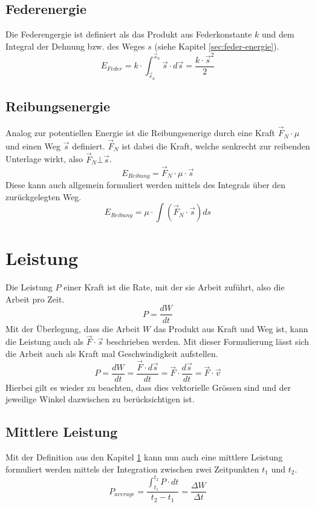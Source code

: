 \subsection{Federenergie}
Die Federengergie ist definiert als das Produkt aus Federkonstante $k$ und 
dem Integral der Dehnung bzw. des Weges $s$ 
(siehe Kapitel \ref{sec:feder-energie}).
\[ \boxed{E_{Feder} 
	= k \cdot \int_{\vec{s}_a}^{\vec{s}_b} \vec{s} \cdot d\vec{s} 
	= \frac{k \cdot \vec{s}^2}{2}} \]

\subsection{Reibungsenergie}
Analog zur potentiellen Energie ist die Reibungsenerige durch eine Kraft
$\vec{F}_N \cdot \mu$ und einen Weg $\vec{s}$ definiert. 
$\vec{F}_N$ ist dabei die Kraft, welche senkrecht zur reibenden Unterlage 
wirkt, also $\vec{F}_N \bot \vec{s}$.
\[ \boxed{E_{Reibung} = \vec{F}_N \cdot \mu \cdot \vec{s}} \]
Diese kann auch allgemein formuliert werden mittels des Integrals über
den zurückgelegten Weg.
\[ \boxed{
	E_{Reibung} = \mu \cdot \int \left( 
		\vec{F}_N \cdot \vec{s} \right) ds} 
\]

\section{Leistung}\label{sec:leistung}
Die Leistung $P$ einer Kraft ist die Rate, mit der sie Arbeit zuführt,
also die Arbeit pro Zeit.
\[ \boxed{P = \frac{dW}{dt} } \]
Mit der Überlegung, dass die Arbeit $W$ das Produkt aus Kraft und Weg
ist, kann die Leistung auch als $\vec{F} \cdot \vec{s}$ beschrieben
werden. Mit dieser Formulierung lässt sich die Arbeit auch als Kraft mal
Geschwindigkeit aufstellen.
\[ \boxed{
	P 
		= \frac{dW}{dt} 
		= \frac{\vec{F} \cdot d\vec{s}}{dt}
		= \vec{F} \cdot \frac{d\vec{s}}{dt} 
		= \vec{F} \cdot \vec{v}
} \]
Hierbei gilt es wieder zu beachten, dass dies vektorielle Grössen sind
und der jeweilige Winkel dazwischen zu berücksichtigen ist.

\subsection{Mittlere Leistung}
Mit der Definition aus den Kapitel \ref{sec:leistung} kann nun auch eine
mittlere Leistung formuliert werden mittels der Integration zwischen
zwei Zeitpunkten $t_1$ und $t_2$.
\[ \boxed{
	P_{average} 
		= \frac{\displaystyle\int_{t_1}^{t_2} P\cdot dt}
			{t_2 - t_1}
		= \frac{\Delta W}{\Delta t} 
} \]
